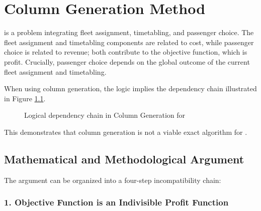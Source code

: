 \chapter{Column Generation Method}

\problemName is a problem integrating fleet assignment, timetabling, and passenger choice. The fleet assignment and timetabling components are related to cost, while passenger choice is related to revenue; both contribute to the objective function, which is profit. Crucially, passenger choice depends on the global outcome of the current fleet assignment and timetabling.

When using column generation, the logic implies the dependency chain illustrated in Figure \ref{fig:cg_logic}.

\begin{figure}[h]
\centering
{}
\caption{Logical dependency chain in Column Generation for \problemName}
\label{fig:cg_logic}
\end{figure}

This demonstrates that column generation is not a viable exact algorithm for \problemName.

\section{Mathematical and Methodological Argument}

The argument can be organized into a four-step incompatibility chain:

\subsection*{1. \problemName Objective Function is an Indivisible Profit Function}

